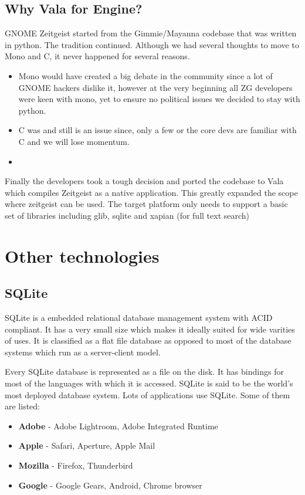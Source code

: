 \subsection{Why Vala for Engine?}
GNOME Zeitgeist started from the Gimmie/Mayanna codebase that was written 
in python. The tradition continued. Although we had several thoughts to move 
to Mono and C, it never happened for several reasons. 
\begin{itemize}
\item Mono would have created a big debate in the community since a lot of 
GNOME hackers dislike it, however at the very beginning all ZG developers were 
keen with mono, yet to ensure no political issues we decided to stay with python.
\item C was and still is an issue since, only a few or the core devs are familiar 
with C and we will lose momentum.
\item 
\end{itemize}
Finally the developers took a tough decision and ported the codebase to Vala 
which compiles Zeitgeist as a native application. This greatly expanded the 
scope where zeitgeist can be used. The target platform only needs to support 
a basic set of libraries including glib, sqlite and xapian (for full text search)


\section{Other technologies}
\subsection{SQLite}
SQLite is a embedded relational database management system with ACID compliant. It 
has a very small size which makes it ideally suited for wide varities of uses. It is 
classified as a flat file database as opposed to most of the database systems which 
run as a server-client model.

Every SQLite database is represented as a file on the disk. It has bindings for most 
of the languages with which it is accessed. SQLite is said to be the world's most 
deployed database system. Lots of applications use SQLite. Some of them are listed: 
\begin{itemize}
\item \textbf{Adobe} - Adobe Lightroom, Adobe Integrated Runtime
\item \textbf{Apple} - Safari, Aperture, Apple Mail
\item \textbf{Mozilla} - Firefox, Thunderbird
\item \textbf{Google} - Google Gears, Android, Chrome browser
\end{itemize}


